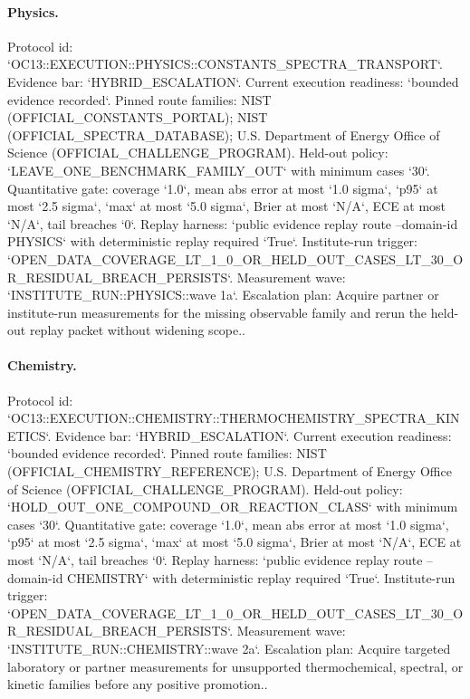 \paragraph{Physics.}
Protocol id: `OC13::EXECUTION::PHYSICS::CONSTANTS\_SPECTRA\_TRANSPORT`. Evidence bar: `HYBRID\_ESCALATION`. Current execution readiness: `bounded evidence recorded`.
Pinned route families: NIST (OFFICIAL\_CONSTANTS\_PORTAL); NIST (OFFICIAL\_SPECTRA\_DATABASE); U.S. Department of Energy Office of Science (OFFICIAL\_CHALLENGE\_PROGRAM).
Held-out policy: `LEAVE\_ONE\_BENCHMARK\_FAMILY\_OUT` with minimum cases `30`.
Quantitative gate: coverage `1.0`, mean abs error at most `1.0 sigma`, `p95` at most `2.5 sigma`, `max` at most `5.0 sigma`, Brier at most `N/A`, ECE at most `N/A`, tail breaches `0`.
Replay harness: `public evidence replay route --domain-id PHYSICS` with deterministic replay required `True`.
Institute-run trigger: `OPEN\_DATA\_COVERAGE\_LT\_1\_0\_OR\_HELD\_OUT\_CASES\_LT\_30\_OR\_RESIDUAL\_BREACH\_PERSISTS`. Measurement wave: `INSTITUTE\_RUN::PHYSICS::wave 1a`.
Escalation plan: Acquire partner or institute-run measurements for the missing observable family and rerun the held-out replay packet without widening scope..

\paragraph{Chemistry.}
Protocol id: `OC13::EXECUTION::CHEMISTRY::THERMOCHEMISTRY\_SPECTRA\_KINETICS`. Evidence bar: `HYBRID\_ESCALATION`. Current execution readiness: `bounded evidence recorded`.
Pinned route families: NIST (OFFICIAL\_CHEMISTRY\_REFERENCE); U.S. Department of Energy Office of Science (OFFICIAL\_CHALLENGE\_PROGRAM).
Held-out policy: `HOLD\_OUT\_ONE\_COMPOUND\_OR\_REACTION\_CLASS` with minimum cases `30`.
Quantitative gate: coverage `1.0`, mean abs error at most `1.0 sigma`, `p95` at most `2.5 sigma`, `max` at most `5.0 sigma`, Brier at most `N/A`, ECE at most `N/A`, tail breaches `0`.
Replay harness: `public evidence replay route --domain-id CHEMISTRY` with deterministic replay required `True`.
Institute-run trigger: `OPEN\_DATA\_COVERAGE\_LT\_1\_0\_OR\_HELD\_OUT\_CASES\_LT\_30\_OR\_RESIDUAL\_BREACH\_PERSISTS`. Measurement wave: `INSTITUTE\_RUN::CHEMISTRY::wave 2a`.
Escalation plan: Acquire targeted laboratory or partner measurements for unsupported thermochemical, spectral, or kinetic families before any positive promotion..

